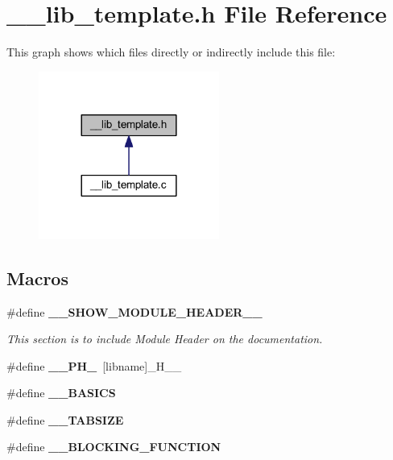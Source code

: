 \section{\-\_\-\-\_\-lib\-\_\-template.\-h File Reference}
\label{____lib__template_8h}
This graph shows which files directly or indirectly include this file\-:\nopagebreak
\begin{figure}[H]
\begin{center}
\leavevmode
\includegraphics[width=168pt]{____lib__template_8h__dep__incl}
\end{center}
\end{figure}
\subsection*{Macros}
\begin{DoxyCompactItemize}
\item 
\#define {\bf \-\_\-\-\_\-\-S\-H\-O\-W\-\_\-\-M\-O\-D\-U\-L\-E\-\_\-\-H\-E\-A\-D\-E\-R\-\_\-\-\_\-}
\begin{DoxyCompactList}\small\item\em This section is to include Module Header on the documentation. \end{DoxyCompactList}\item 
\#define {\bf \-\_\-\-\_\-\-P\-H\-\_\-}~[libname]\-\_\-\-H\-\_\-\-\_\-
\item 
\#define {\bf \-\_\-\-\_\-\-B\-A\-S\-I\-C\-S}
\item 
\#define {\bf \-\_\-\-\_\-\-T\-A\-B\-S\-I\-Z\-E}
\item 
\#define {\bf \-\_\-\-\_\-\-B\-L\-O\-C\-K\-I\-N\-G\-\_\-\-F\-U\-N\-C\-T\-I\-O\-N}
\end{DoxyCompactItemize}
